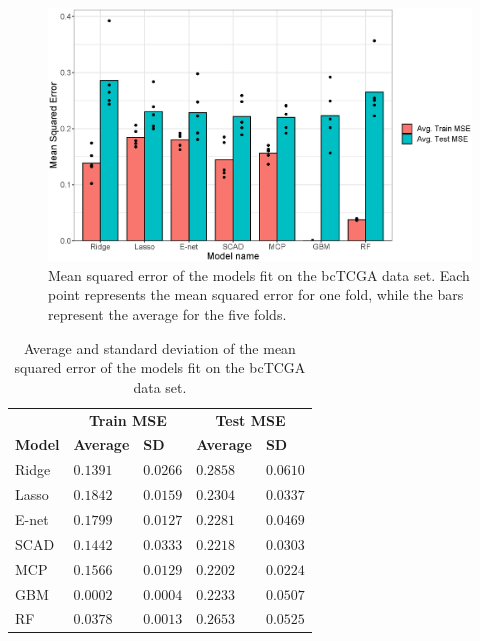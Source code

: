 \documentclass{article}
\begin{document}
\begin{figure}[h!]
	\centering
	\includegraphics[width = 0.8\linewidth]{images/empirical_mse.eps}
	\captionsetup{width = 0.8\textwidth}
	\caption{Mean squared error of the models fit on the bcTCGA data set. Each point represents the mean squared error for one fold, while the bars represent the average for the five folds.}
	\label{fig:empirical_mse}
\end{figure}

\begin{table}[b!]
\centering
\captionsetup{width = 5in}
\caption{Average and standard deviation of the mean squared error of the models fit on the bcTCGA data set.}
\label{tab:emp_results}
\begin{tabular}{l|ll|ll}
	\hline
	& \multicolumn{2}{c|}{\textbf{Train MSE}} & \multicolumn{2}{c}{\textbf{Test MSE}} \\ 
	\textbf{Model } & \textbf{Average} & \textbf{SD} & \textbf{Average} & \textbf{SD} \\ 
	\hline
	Ridge  & $0.1391$ & $0.0266$ & $0.2858$ & $0.0610$ \\
	Lasso  & $0.1842$ & $0.0159$ & $0.2304$ & $0.0337$ \\
	E-net  & $0.1799$ & $0.0127$ & $0.2281$ & $0.0469$ \\
	SCAD  & $0.1442$ & $0.0333$ & $0.2218$ & $0.0303$ \\
	MCP  & $0.1566$ & $0.0129$ & $0.2202$ & $0.0224$ \\
	GBM  & $0.0002$ & $0.0004$ & $0.2233$ & $0.0507$ \\
	RF  & $0.0378$ & $0.0013$ & $0.2653$ & $0.0525$ \\
	\hline 
\end{tabular}
\end{table}
\end{document}

